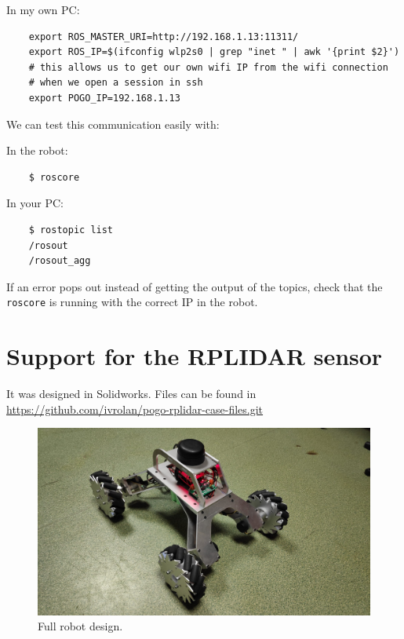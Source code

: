 \documentclass{article}
\begin{document}
In my own PC:

\begin{verbatim}
    export ROS_MASTER_URI=http://192.168.1.13:11311/
    export ROS_IP=$(ifconfig wlp2s0 | grep "inet " | awk '{print $2}') 
    # this allows us to get our own wifi IP from the wifi connection 
    # when we open a session in ssh
    export POGO_IP=192.168.1.13
\end{verbatim}

We can test this communication easily with:

In the robot:

\begin{verbatim}
    $ roscore
\end{verbatim}

In your PC:
\begin{verbatim}
    $ rostopic list
    /rosout
    /rosout_agg
\end{verbatim}

If an error pops out instead of getting the output of the topics, check that the \verb|roscore| is running with the correct IP in the robot.

\section{Support for the RPLIDAR sensor}

It was designed in Solidworks. Files can be found in 
\href{https://github.com/ivrolan/pogo-rplidar-case-files.git}{https://github.com/ivrolan/pogo-rplidar-case-files.git}

\begin{figure}[H]
    \centering
    \includegraphics[width=\linewidth]{pogo_robot_full.jpeg}
    \caption{Full robot design.}
    \label{fig:fullroobot}
\end{figure}
\end{document}
